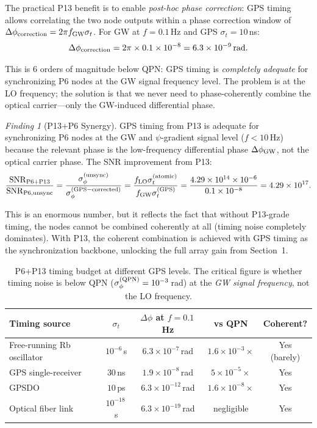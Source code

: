 \documentclass[11pt]{article}
\theoremstyle{definition}
\theoremstyle{remark}
\newtheorem{finding}[theorem]{Finding}
\begin{document}
The practical P13 benefit is to enable \emph{post-hoc phase correction}:
GPS timing allows correlating the two node outputs within a phase correction
window of $\Delta\phi_{\rm correction} = 2\pi f_{\rm GW} \sigma_t$. For
GW at $f = 0.1$\,Hz and GPS $\sigma_t = 10$\,ns:
\begin{equation}
\Delta\phi_{\rm correction} = 2\pi \times 0.1 \times 10^{-8}
= 6.3\times10^{-9}\,\mathrm{rad}.
\end{equation}

This is 6 orders of magnitude below QPN: GPS timing is \emph{completely
adequate} for synchronizing P6 nodes at the GW signal frequency level.
The problem is at the LO frequency; the solution is that we never need to
phase-coherently combine the optical carrier---only the GW-induced differential
phase.

\begin{finding}[P13+P6 Synergy]
GPS timing from P13 is adequate for synchronizing P6 nodes at the
GW and $\psi$-gradient signal level ($f < 10$\,Hz) because the
relevant phase is the low-frequency differential phase $\Delta\phi_{\rm GW}$,
not the optical carrier phase. The SNR improvement from P13:
\begin{equation}
\frac{\mathrm{SNR}_{\rm P6+P13}}{\mathrm{SNR}_{\rm P6, unsync}}
= \frac{\sigma_\phi^{(\rm unsync)}}{\sigma_\phi^{(\rm GPS-corrected)}}
= \frac{f_{\rm LO} \sigma_t^{(\rm atomic)}}{f_{\rm GW} \sigma_t^{(\rm GPS)}}
= \frac{4.29\times10^{14} \times 10^{-6}}{0.1 \times 10^{-8}}
= 4.29\times10^{17}.
\end{equation}
\end{finding}

This is an enormous number, but it reflects the fact that without P13-grade
timing, the nodes cannot be combined coherently at all (timing noise completely
dominates). With P13, the coherent combination is achieved with GPS timing as
the synchronization backbone, unlocking the full array gain from Section~1.

\begin{table}[h]
\centering
\caption{P6+P13 timing budget at different GPS levels. The critical figure is
whether timing noise is below QPN ($\sigma_\phi^{(\rm QPN)} = 10^{-3}$\,rad)
at the \emph{GW signal frequency}, not the LO frequency.}
\begin{tabular}{@{}lcccc@{}}
\toprule
Timing source & $\sigma_t$ & $\Delta\phi$ at $f=0.1$\,Hz & vs QPN & Coherent? \\
\midrule
Free-running Rb oscillator & $10^{-6}$\,s & $6.3\times10^{-7}$\,rad & $1.6\times10^{-3}\times$ & Yes (barely) \\
GPS single-receiver & $30$\,ns & $1.9\times10^{-8}$\,rad & $5\times10^{-5}\times$ & Yes \\
GPSDO & $10$\,ps & $6.3\times10^{-12}$\,rad & $1.6\times10^{-8}\times$ & Yes \\
Optical fiber link & $10^{-18}$\,s & $6.3\times10^{-19}$\,rad & negligible & Yes \\
\bottomrule
\end{tabular}
\end{table}
\end{document}
